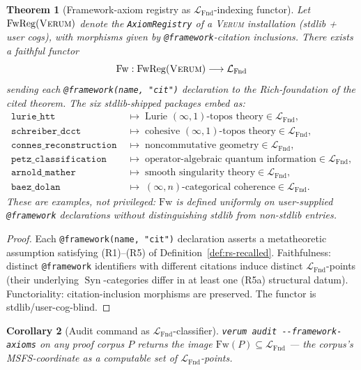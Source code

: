 \documentclass[11pt, a4paper]{article}
\newtheorem{theorem}{Theorem}[section]
\newtheorem{corollary}[theorem]{Corollary}
\theoremstyle{definition}
\theoremstyle{remark}
\newcommand{\LFnd}{\mathcal{L}_{\mathrm{Fnd}}}
\DeclareMathOperator{\Syn}{Syn}
\newcommand{\Verum}{\textsc{Verum}}
\begin{document}
\begin{theorem}[Framework-axiom registry as $\LFnd$-indexing functor]
\label{thm:fnd-correspondence}
Let $\mathrm{FwReg}(\Verum)$ denote the \texttt{AxiomRegistry} of a \Verum{} installation (stdlib + user cogs), with morphisms given by \texttt{@framework}-citation inclusions. There exists a faithful functor
\[
\mathrm{Fw} : \mathrm{FwReg}(\Verum) \longrightarrow \LFnd
\]
sending each \texttt{@framework(name, "cit")} declaration to the Rich-foundation of the cited theorem. The six stdlib-shipped packages embed as:
\begin{align*}
\texttt{lurie\_htt}           &\;\longmapsto\; \text{Lurie } (\infty, 1)\text{-topos theory} \in \LFnd, \\
\texttt{schreiber\_dcct}      &\;\longmapsto\; \text{cohesive } (\infty, 1)\text{-topos theory} \in \LFnd, \\
\texttt{connes\_reconstruction} &\;\longmapsto\; \text{noncommutative geometry} \in \LFnd, \\
\texttt{petz\_classification} &\;\longmapsto\; \text{operator-algebraic quantum information} \in \LFnd, \\
\texttt{arnold\_mather}       &\;\longmapsto\; \text{smooth singularity theory} \in \LFnd, \\
\texttt{baez\_dolan}          &\;\longmapsto\; (\infty, n)\text{-categorical coherence} \in \LFnd.
\end{align*}
These are \emph{examples}, not privileged: $\mathrm{Fw}$ is defined uniformly on user-supplied \texttt{@framework} declarations without distinguishing stdlib from non-stdlib entries.
\end{theorem}

\begin{proof}
Each \texttt{@framework(name, "cit")} declaration asserts a metatheoretic assumption satisfying (R1)--(R5) of Definition~\ref{def:rs-recalled}. Faithfulness: distinct \texttt{@framework} identifiers with different citations induce distinct $\LFnd$-points (their underlying $\Syn$-categories differ in at least one (R5a) structural datum). Functoriality: citation-inclusion morphisms are preserved. The functor is stdlib/user-cog-blind.
\end{proof}

\begin{corollary}[Audit command as $\LFnd$-classifier]
\label{cor:audit-classifier}
\verb|verum audit --framework-axioms| on any proof corpus $P$ returns the image $\mathrm{Fw}(P) \subseteq \LFnd$ --- the corpus's MSFS-coordinate as a computable set of $\LFnd$-points.
\end{corollary}
\end{document}
